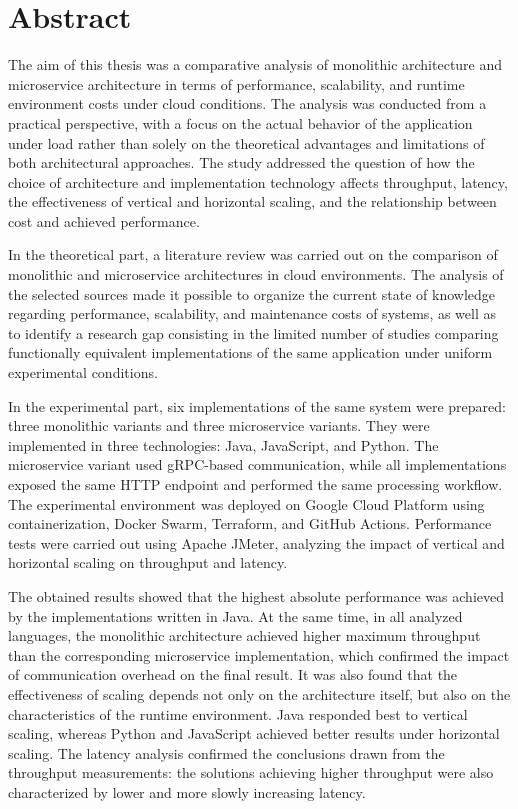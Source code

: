 \section*{Abstract}

The aim of this thesis was a comparative analysis of monolithic architecture and microservice architecture in terms of performance, scalability, and runtime environment costs under cloud conditions. The analysis was conducted from a practical perspective, with a focus on the actual behavior of the application under load rather than solely on the theoretical advantages and limitations of both architectural approaches. The study addressed the question of how the choice of architecture and implementation technology affects throughput, latency, the effectiveness of vertical and horizontal scaling, and the relationship between cost and achieved performance.

In the theoretical part, a literature review was carried out on the comparison of monolithic and microservice architectures in cloud environments. The analysis of the selected sources made it possible to organize the current state of knowledge regarding performance, scalability, and maintenance costs of systems, as well as to identify a research gap consisting in the limited number of studies comparing functionally equivalent implementations of the same application under uniform experimental conditions.

In the experimental part, six implementations of the same system were prepared: three monolithic variants and three microservice variants. They were implemented in three technologies: Java, JavaScript, and Python. The microservice variant used gRPC-based communication, while all implementations exposed the same HTTP endpoint and performed the same processing workflow. The experimental environment was deployed on Google Cloud Platform using containerization, Docker Swarm, Terraform, and GitHub Actions. Performance tests were carried out using Apache JMeter, analyzing the impact of vertical and horizontal scaling on throughput and latency.

The obtained results showed that the highest absolute performance was achieved by the implementations written in Java. At the same time, in all analyzed languages, the monolithic architecture achieved higher maximum throughput than the corresponding microservice implementation, which confirmed the impact of communication overhead on the final result. It was also found that the effectiveness of scaling depends not only on the architecture itself, but also on the characteristics of the runtime environment. Java responded best to vertical scaling, whereas Python and JavaScript achieved better results under horizontal scaling. The latency analysis confirmed the conclusions drawn from the throughput measurements: the solutions achieving higher throughput were also characterized by lower and more slowly increasing latency.

